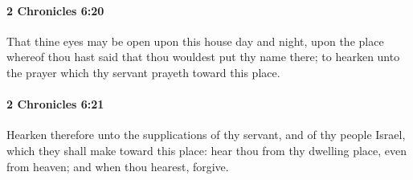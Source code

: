 		\paragraph{2 Chronicles 6:20} %
			\label{2CHRONICLES-6-20}

			That thine eyes may be open upon this house day and night, upon the place whereof thou hast said that thou wouldest put thy name there; to hearken unto the prayer which thy servant prayeth toward this place.


		\paragraph{2 Chronicles 6:21} %
			\label{2CHRONICLES-6-21}

			Hearken therefore unto the supplications of thy servant, and of thy people Israel, which they shall make toward this place: hear thou from thy dwelling place, even from heaven; and when thou hearest, forgive.

